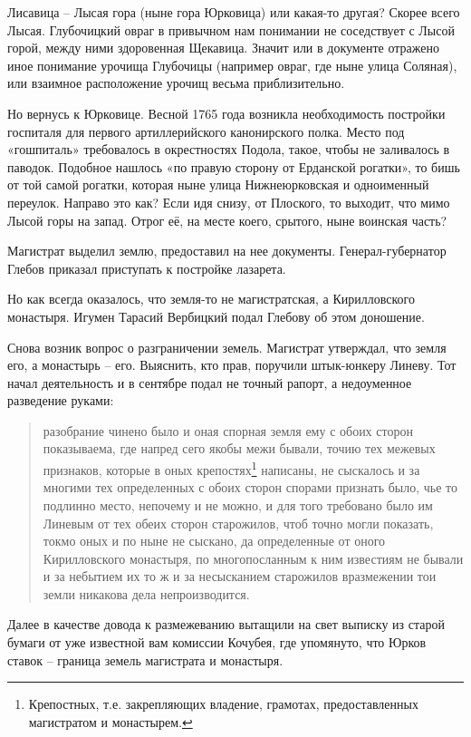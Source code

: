Лисавица – Лысая гора (ныне гора Юрковица) или какая-то другая? Скорее всего Лысая. Глубочицкий овраг в привычном нам понимании не соседствует с Лысой горой, между ними здоровенная Щекавица. Значит или в документе отражено иное понимание урочища Глубочицы (например овраг, где ныне улица Соляная), или взаимное расположение урочищ весьма приблизительно.

Но вернусь к Юрковице. Весной 1765 года возникла необходимость постройки госпиталя для первого артиллерийского канонирского полка. Место под «гошпиталь» требовалось в окрестностях Подола, такое, чтобы не заливалось в паводок. Подобное нашлось «по правую сторону от Ерданской рогатки», то бишь от той самой рогатки, которая ныне улица Нижнеюрковская и одноименный переулок. Направо это как? Если идя снизу, от Плоского, то выходит, что мимо Лысой горы на запад. Отрог её, на месте коего, срытого, ныне воинская часть?

Магистрат выделил землю, предоставил на нее документы. Генерал-губернатор Глебов приказал приступать к постройке лазарета.

Но как всегда оказалось, что земля-то не магистратская, а Кирилловского монастыря. Игумен Тарасий Вербицкий подал Глебову об этом доношение.

Снова возник вопрос о разграничении земель. Магистрат утверждал, что земля его, а монастырь – его. Выяснить, кто прав, поручили штык-юнкеру Линеву. Тот начал деятельность и в сентябре подал не точный рапорт, а недоуменное разведение руками:

\begin{quotation}
разобрание чинено было и оная спорная земля ему с обоих сторон показываема, где напред сего якобы межи бывали, точию тех межевых признаков, которые в оных крепостях\footnote{Крепостных, т.е. закрепляющих владение, грамотах, предоставленных магистратом и монастырем.} написаны, не сыскалось и за многими тех определенных с обоих сторон спорами признать было, чье то подлинно место, непочему и не можно, и для того требовано было им Линевым от тех обеих сторон старожилов, чтоб точно могли показать, токмо оных и по ныне не сыскано, да определенные от оного Кирилловского монастыря, по многопосланным к ним известиям не бывали и за небытием их то ж и за несысканием старожилов вразмежении тои земли никакова дела непроизводится.
\end{quotation}

Далее в качестве довода к размежеванию вытащили на свет выписку из старой бумаги от уже известной вам комиссии Кочубея, где упомянуто, что Юрков ставок – граница земель магистрата и монастыря.

